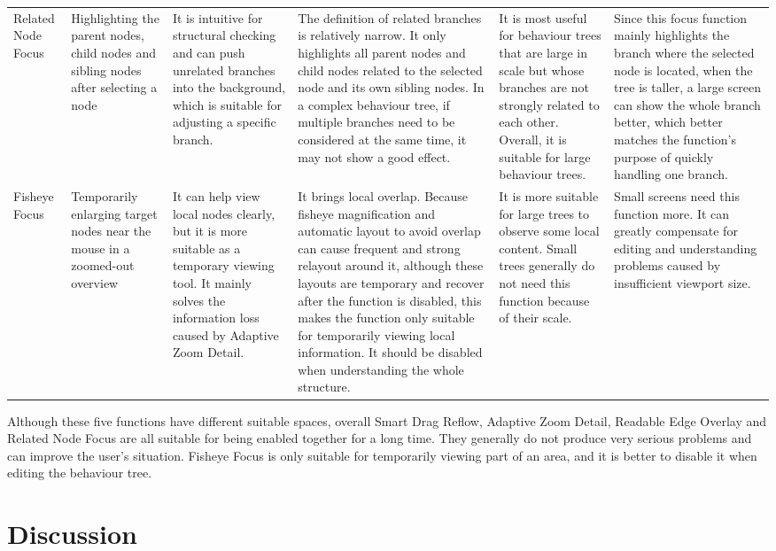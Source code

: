 \documentclass[11pt,a4paper,oneside,extrafontsizes]{memoir}
\begin{document}
\begin{center}
\begin{longtable}{@{}p{} p{} p{} p{} p{} p{}@{}}
Related Node Focus & Highlighting the parent nodes, child nodes and sibling nodes after selecting a node & It is intuitive for structural checking and can push unrelated branches into the background, which is suitable for adjusting a specific branch. & The definition of related branches is relatively narrow. It only highlights all parent nodes and child nodes related to the selected node and its own sibling nodes. In a complex behaviour tree, if multiple branches need to be considered at the same time, it may not show a good effect. & It is most useful for behaviour trees that are large in scale but whose branches are not strongly related to each other. Overall, it is suitable for large behaviour trees. & Since this focus function mainly highlights the branch where the selected node is located, when the tree is taller, a large screen can show the whole branch better, which better matches the function's purpose of quickly handling one branch. \\
Fisheye Focus & Temporarily enlarging target nodes near the mouse in a zoomed-out overview & It can help view local nodes clearly, but it is more suitable as a temporary viewing tool. It mainly solves the information loss caused by Adaptive Zoom Detail. & It brings local overlap. Because fisheye magnification and automatic layout to avoid overlap can cause frequent and strong relayout around it, although these layouts are temporary and recover after the function is disabled, this makes the function only suitable for temporarily viewing local information. It should be disabled when understanding the whole structure. & It is more suitable for large trees to observe some local content. Small trees generally do not need this function because of their scale. & Small screens need this function more. It can greatly compensate for editing and understanding problems caused by insufficient viewport size. \\
\bottomrule
\end{longtable}
\end{center}

Although these five functions have different suitable spaces, overall Smart Drag Reflow, Adaptive Zoom Detail, Readable Edge Overlay and Related Node Focus are all suitable for being enabled together for a long time. They generally do not produce very serious problems and can improve the user's situation. Fisheye Focus is only suitable for temporarily viewing part of an area, and it is better to disable it when editing the behaviour tree.

\chapter{Discussion}
\end{document}
